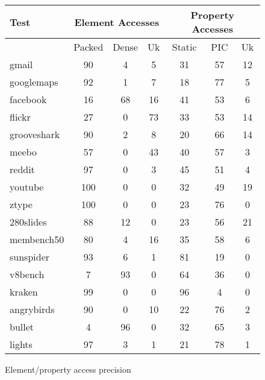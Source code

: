 \begin{figure}
\begin{center}
\begin{tabular}{|l|ccc|ccc|}
\hline
Test & \multicolumn{3}{|c|}{Element Accesses}
     & \multicolumn{3}{|c|}{Property Accesses} \\
\hline
     & Packed & Dense & Uk
     & Static & PIC & Uk \\
\hline
gmail          & 90 & 4 & 5 & 31 & 57 & 12 \\
googlemaps     & 92 & 1 & 7 & 18 & 77 & 5 \\
facebook       & 16 & 68 & 16 & 41 & 53 & 6 \\
flickr         & 27 & 0 & 73 & 33 & 53 & 14 \\
grooveshark    & 90 & 2 & 8 & 20 & 66 & 14 \\
meebo          & 57 & 0 & 43 & 40 & 57 & 3 \\
reddit         & 97 & 0 & 3 & 45 & 51 & 4 \\
youtube        & 100 & 0 & 0 & 32 & 49 & 19 \\
ztype          & 100 & 0 & 0 & 23 & 76 & 0 \\
280slides      & 88 & 12 & 0 & 23 & 56 & 21 \\
membench50     & 80 & 4 & 16 & 35 & 58 & 6 \\
sunspider      & 93 & 6 & 1 & 81 & 19 & 0 \\
v8bench        & 7 & 93 & 0 & 64 & 36 & 0 \\
kraken         & 99 & 0 & 0 & 96 & 4 & 0 \\
angrybirds     & 90 & 0 & 10 & 22 & 76 & 2 \\
bullet         & 4 & 96 & 0 & 32 & 65 & 3 \\
lights         & 97 & 3 & 1 & 21 & 78 & 1 \\
\hline
\end{tabular}
\end{center}
\caption{Element/property access precision}
\end{figure}

